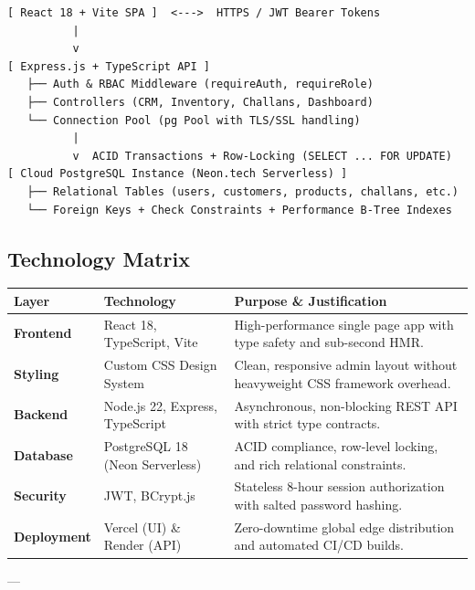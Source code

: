 \documentclass[11pt,a4paper]{article}
\begin{document}
\begin{center}
\begin{tcolorbox}[colback=lightgray,colframe=bordercolor,arc=2mm,width=\textwidth]
\begin{verbatim}
[ React 18 + Vite SPA ]  <--->  HTTPS / JWT Bearer Tokens
          |
          v
[ Express.js + TypeScript API ]
   ├── Auth & RBAC Middleware (requireAuth, requireRole)
   ├── Controllers (CRM, Inventory, Challans, Dashboard)
   └── Connection Pool (pg Pool with TLS/SSL handling)
          |
          v  ACID Transactions + Row-Locking (SELECT ... FOR UPDATE)
[ Cloud PostgreSQL Instance (Neon.tech Serverless) ]
   ├── Relational Tables (users, customers, products, challans, etc.)
   └── Foreign Keys + Check Constraints + Performance B-Tree Indexes
\end{verbatim}
\end{tcolorbox}
\end{center}

\subsection{Technology Matrix}
\begin{table}[htbp]
\centering
\small
\begin{tabularx}{\textwidth}{l l X}
\toprule
\textbf{Layer} & \textbf{Technology} & \textbf{Purpose \& Justification} \\
\midrule
\textbf{Frontend} & React 18, TypeScript, Vite & High-performance single page app with type safety and sub-second HMR. \\
\textbf{Styling} & Custom CSS Design System & Clean, responsive admin layout without heavyweight CSS framework overhead. \\
\textbf{Backend} & Node.js 22, Express, TypeScript & Asynchronous, non-blocking REST API with strict type contracts. \\
\textbf{Database} & PostgreSQL 18 (Neon Serverless) & ACID compliance, row-level locking, and rich relational constraints. \\
\textbf{Security} & JWT, BCrypt.js & Stateless 8-hour session authorization with salted password hashing. \\
\textbf{Deployment} & Vercel (UI) \& Render (API) & Zero-downtime global edge distribution and automated CI/CD builds. \\
\bottomrule
\end{tabularx}
\end{table}

---
\end{document}
